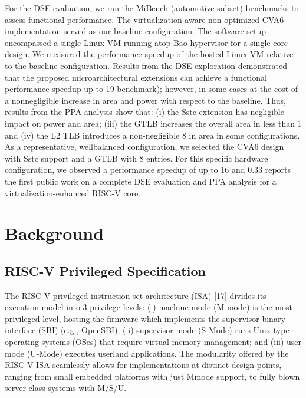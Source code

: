 For the DSE evaluation, we ran the MiBench (automotive subset) benchmarks to assess functional performance.
The virtualization-aware non-optimized CVA6 implementation
served as our baseline configuration. The software setup encompassed a single Linux VM running atop Bao hypervisor for
a single-core design. We measured the performance speedup
of the hosted Linux VM relative to the baseline configuration.
Results from the DSE exploration demonstrated that the proposed microarchitectural extensions can achieve a functional
performance speedup up to 19%
benchmark); however, in some cases at the cost of a nonnegligible increase in area and power with respect to the
baseline. Thus, results from the PPA analysis show that: (i)
the Sstc extension has negligible impact on power and area;
(iii) the GTLB increases the overall area in less than 1%
and (iv) the L2 TLB introduces a non-negligible 8%
in area in some configurations. As a representative, wellbalanced configuration, we selected the CVA6 design with Sstc
support and a GTLB with 8 entries. For this specific hardware
configuration, we observed a performance speedup of up to
16%
and 0.33%
reports the first public work on a complete DSE evaluation
and PPA analysis for a virtualization-enhanced RISC-V core.

\section*{Background}

\subsection*{RISC-V Privileged Specification}

The RISC-V privileged instruction set architecture (ISA)
[17] divides its execution model into 3 privilege levels: (i)
machine mode (M-mode) is the most privileged level, hosting
the firmware which implements the supervisor binary interface (SBI) (e.g., OpenSBI); (ii) supervisor mode (S-Mode)
runs Unix type operating systems (OSes) that require virtual
memory management; and (iii) user mode (U-Mode) executes
userland applications. The modularity offered by the RISC-V
ISA seamlessly allows for implementations at distinct design
points, ranging from small embedded platforms with just Mmode support, to fully blown server class systems with M/S/U.

